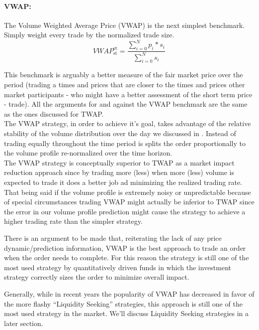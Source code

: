 
\paragraph{VWAP:} 

The Volume Weighted Average Price (VWAP) is the next simplest benchmark. Simply weight every trade by the normalized trade size.
\begin{equation}
	\mathit{VWAP}_{\text{st}} ^{\text{et}}= \frac{\sum_{i=0}^N{p_i*s_i}}{\sum_{i=0}^N{s_i}}
\end{equation}

This benchmark  is arguably a better measure of the fair market price over the period (trading a times and prices that are closer to the times and prices other market participants - who might have a better assessment of the short term price - trade). All the arguments for and against the VWAP benchmark are the same as the ones discussed for TWAP.\\

The VWAP strategy, in order to achieve it's goal, takes advantage of the relative stability of the volume distribution over the day we discussed in . Instead of trading equally throughout the time period is splits the order proportionally to the volume profile re-normalized over the time horizon. \\

The VWAP strategy is conceptually superior to TWAP as a market impact reduction approach since by trading more (less) when more  (less) volume is expected to trade it does a better job ad minimizing the realized trading rate. That being said if the volume profile is extremely noisy or unpredictable because of special circumstances trading VWAP might actually be inferior to TWAP since the error in our volume profile prediction might cause the strategy to achieve a higher trading rate than the simpler strategy.

There is an argument to be made that, reiterating the lack of any price dynamic/prediction information, VWAP is the best approach to trade an order when the order needs to complete. For this reason the strategy is still one of the most used strategy by quantitatively driven funds in which the investment strategy correctly sizes the order to minimize overall impact. 

Generally, while in recent years the popularity of VWAP has decreased in favor of the more flashy ``Liquidity Seeking'' strategies, this approach is still one of the most used strategy in the market. We'll discuss Liquidity Seeking strategies in a later section.

